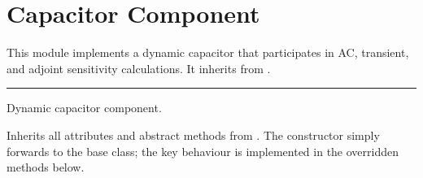 \documentclass[letterpaper,10pt,english]{sphinxmanual}
\begin{document}
\begin{sphinxVerbatim}[commandchars=\\\{\}]
      
     
            
            
            
            \PYG{p}{[}\PYG{p}{]}  
            \PYG{p}{[}\PYG{p}{]}  
                 
            \PYG{p}{[}\PYG{p}{]}  
            \PYG{p}{[}\PYG{p}{]}  
\end{sphinxVerbatim}

\sphinxstepscope


\chapter{Capacitor Component}
\label{\detokenize{component_capacitor:capacitor-component}}\label{\detokenize{component_capacitor:id1}}\label{\detokenize{component_capacitor::doc}}
\sphinxAtStartPar
This module implements a dynamic capacitor that participates in AC, transient,
and adjoint sensitivity calculations.  It inherits from .


\bigskip\hrule\bigskip


\begin{fulllineitems}
\label{\detokenize{component_capacitor:Capacitor}}
\pysigstartsignatures
\pysiglinewithargsret
{}
{\sphinxparamcomma {}}
{}
\pysigstopsignatures
\sphinxAtStartPar
Dynamic capacitor component.

\sphinxAtStartPar
Inherits all attributes and abstract methods from {\hyperref[\detokenize{component_base:Component}]{}}.
The constructor simply forwards to the base class; the key behaviour
is implemented in the overridden methods below.

\end{fulllineitems}
\end{document}
